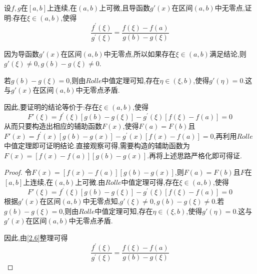 \documentclass[lang=cn,newtx,10pt,scheme=chinese]{elegantbook}
\begin{document}
\begin{exercise}
设\(f,g\)在\([a,b]\)上连续,在\((a,b)\)上可微,且导函数\(g'(x)\)在区间\((a,b)\)中无零点,证明:存在\(\xi\in(a,b)\),使得
\begin{equation}
\frac{f^{\prime}(\xi)}{g^{\prime}(\xi)}=\frac{f(\xi)-f(a)}{g(b)-g(\xi)}
    \nonumber
\end{equation}

\begin{note}
    因为导函数\(g'(x)\)在区间\((a,b)\)中无零点,所以如果存在$\xi\in(a,b)$满足结论,则$g'(\xi)\ne0,g(b)-g(\xi)\ne0$.

    若$g(b)-g(\xi)=0$,则由$Rolle$中值定理可知,存在$\eta\in(\xi,b)$,使得$g'(\eta)=0$.这与\(g'(x)\)在区间\((a,b)\)中无零点矛盾.
    
    因此,要证明的结论等价于:存在$\xi\in(a,b)$,使得
    \begin{equation}
    F'(\xi)=f^{\prime}(\xi )\left[ g(b)-g(\xi ) \right] -g^{\prime}(\xi )\left[ f(\xi )-f(a) \right] =0
        \nonumber
    \end{equation}
    从而只要构造出相应的辅助函数$F(x)$,使得$F(a)=F(b)$且$F'(x)=f^{\prime}(x)\left[ g(b)-g(x) \right] -g^{\prime}(x)\left[ f(x)-f(a) \right] =0$,再利用$Rolle$中值定理即可证明结论.直接观察可得,需要构造的辅助函数为$F(x)=[f(x)-f(a)][g(b)-g(x)]$.再将上述思路严格化即可得证.
\end{note}

    \begin{proof}
    令$F(x)=[f(x)-f(a)][g(b)-g(x)]$,则$F(a)=F(b)$且\(F\)在\([a,b]\)上连续,在\((a,b)\)上可微.由$Rolle$中值定理可得,存在$\xi\in(a,b)$,使得
    \begin{equation}\label{2.6}
    F'(\xi)=f^{\prime}(\xi )\left[ g(b)-g(\xi ) \right] -g^{\prime}(\xi )\left[ f(\xi )-f(a) \right] =0
    \end{equation}
    根据$g'(x)$在区间$(a,b)$中无零点知,$g'(\xi)\ne0,g(b)-g(\xi)\ne0$.若$g(b)-g(\xi)=0$,则由$Rolle$中值定理可知,存在$\eta\in(\xi,b)$,使得$g'(\eta)=0$.这与\(g'(x)\)在区间\((a,b)\)中无零点矛盾.

    因此,由\eqref{2.6}整理可得
    \begin{equation}
\frac{f^{\prime}(\xi)}{g^{\prime}(\xi)}=\frac{f(\xi)-f(a)}{g(b)-g(\xi)}
    \nonumber
\end{equation}
    \end{proof}
\end{exercise}
\end{document}
